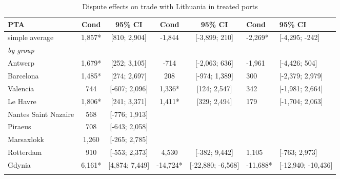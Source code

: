 \begin{table}[ht]
\centering
\caption{Dispute effects on trade with Lithuania in treated ports} 
\begingroup\begin{adjustbox}{max width=\textwidth}
\begin{tabular}{lccccll}
  \hline
\hline
PTA & Cond & 95\% CI & Cond & 95\% CI & Cond & 95\% CI \\ 
  \hline
simple average & 1,857* & [810; 2,904] &  -1,844 & [-3,899; 210] &  -2,269* & [-4,295; -242] \\ 
   [1ex]\emph{by group} &  &  &  &  &  &  \\ 
   \hline
Antwerp & 1,679* & [252; 3,105] &    -714 & [-2,063; 636] &  -1,961 & [-4,426; 504] \\ 
  Barcelona & 1,485* & [274; 2,697] &     208 & [-974; 1,389] &     300 & [-2,379; 2,979] \\ 
  Valencia &   744 & [-607; 2,096] &   1,336* & [124; 2,547] &     342 & [-1,981; 2,664] \\ 
  Le Havre & 1,806* & [241; 3,371] &   1,411* & [329; 2,494] &     179 & [-1,704; 2,063] \\ 
  Nantes Saint Nazaire &   568 & [-776; 1,913] &  &  &  &  \\ 
  Piraeus &   708 & [-643; 2,058] &  &  &  &  \\ 
  Marsaxlokk & 1,260 & [-265; 2,785] &  &  &  &  \\ 
  Rotterdam &   910 & [-553; 2,373] &   4,530 & [-382; 9,442] &   1,105 & [-763; 2,973] \\ 
  Gdynia & 6,161* & [4,874; 7,449] & -14,724* & [-22,880; -6,568] & -11,688* & [-12,940; -10,436] \\ 
   [2ex] \hline \hline {}\end{tabular} 
 \end{adjustbox} \label{tab:marginal_results}
\endgroup
\end{table}
